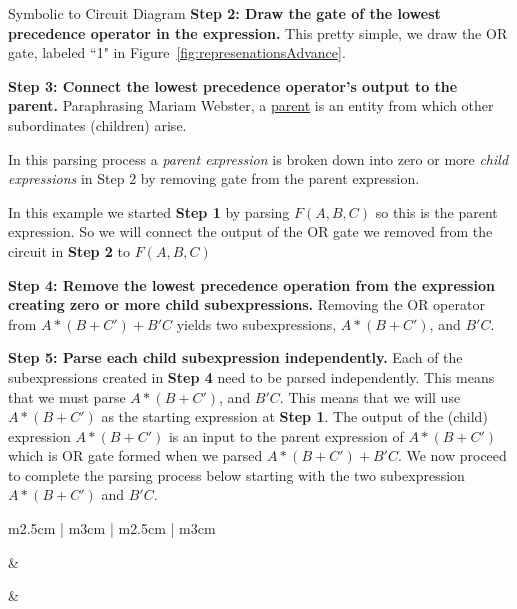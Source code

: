 \begin{process}{Symbolic to Circuit Diagram}
\textbf{Step 2: Draw the gate of the lowest precedence operator in the expression.}
This pretty simple, we draw the OR gate, labeled ``1" in 
Figure~\ref{fig:represenationsAdvance}.  

\textbf{Step 3: Connect the lowest precedence operator's output to the parent.}
Paraphrasing Mariam Webster, a 
\href{https://merriam-webster.com/dictionary/parent}{parent} 
is an entity from which other subordinates (children) arise.

In this parsing process a \textit{parent expression} 
is broken down into zero or more \textit{child expressions} 
in Step 2 by removing gate from the parent expression.

In this example we started \textbf{Step 1} by parsing 
$F(A,B,C)$ so this is the parent expression.  So we will connect the output 
of the OR gate we removed from the circuit in \textbf{Step 2} to $F(A,B,C)$

\textbf {Step 4: Remove the lowest precedence operation from the expression 
creating zero or more child subexpressions.}
Removing the OR operator from $A*(B+C')+B'C$ yields two subexpressions, 
$A*(B+C')$, and $B'C$.  

\textbf {Step 5: Parse each child subexpression independently.}
Each of the subexpressions created in \textbf{Step 4} need to be parsed independently.
This means that we must parse $A*(B+C')$, and $B'C$.  This means that we will 
use $A*(B+C')$ as the starting expression at \textbf{Step 1}.  The output of the
(child) expression $A*(B+C')$ is an input to the parent expression of $A*(B+C')$
which is OR gate formed when we parsed $A*(B+C')+B'C$.  We now proceed to 
complete the parsing process below starting with the two subexpression
$A*(B+C')$	and $B'C$.
\vspace{0.2cm}

\begin{tabular}{m{2.5cm} | m{3cm} | m{2.5cm} | m{3cm}}

		& 	 \\ \hline

  &
 \\ \hline


\end{tabular}
\end{process}
